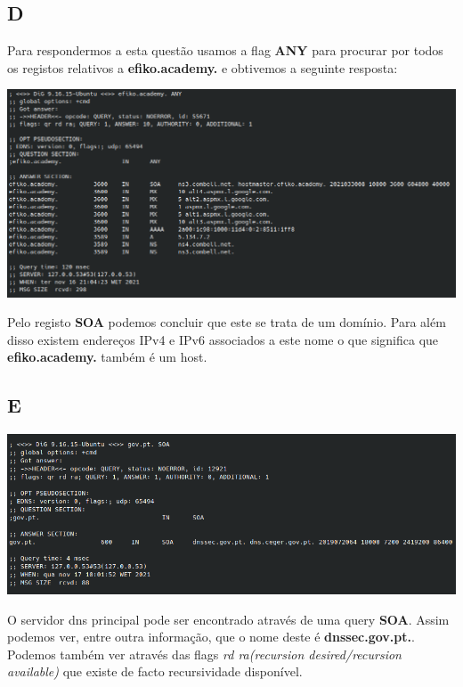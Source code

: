 \documentclass{report}
\begin{document}
        \subsection*{D}
                Para respondermos a esta questão usamos a flag \textbf{ANY} para procurar por todos os registos relativos a \textbf{efiko.academy.} e obtivemos a seguinte resposta:

            \vspace{0.45em}
            \noindent
            \includegraphics[width=\textwidth]{images/dig_efiko.png}
            \par

            \vspace{0.45em}
                Pelo registo \textbf{SOA} podemos concluir que este se trata de um domínio.
                Para além disso existem endereços IPv4 e IPv6 associados a este nome o que significa que \textbf{efiko.academy.} também é um host.
        \subsection*{E}
            \noindent
            \includegraphics[width=\textwidth]{images/dig_gov_soa.png}
            \par
            
            O servidor dns principal pode ser encontrado através de uma query \textbf{SOA}.
            Assim podemos ver, entre outra informação, que o nome deste é \textbf{dnssec.gov.pt.}. Podemos também ver através das flags \textit{rd ra(recursion desired/recursion available)} que existe de facto recursividade disponível.
        \pagebreak
\end{document}
